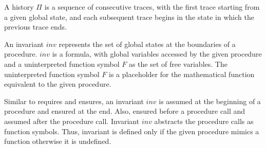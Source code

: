 \documentclass{llncs}
\newcommand{\inv}{\mathit{inv}}
\newcommand{\history}{\Pi}
\newcommand{\F}{\mathit{F}}
\begin{document}
\begin{definition}[history]
  A history $\history$ is a sequence of consecutive traces, with the
  first trace starting from a given global state, and each subsequent
  trace begins in the state in which the previous trace ends.
\end{definition}

\begin{definition}[invariant]
  An invariant $\inv$ represents the set of global states at the
  boundaries of a procedure. $\inv$ is a formula, with 
  global variables accessed by the given procedure and a uninterpreted
  function symbol $\F$ as the set of free variables.
  The uninterpreted function symbol $\F$ is a placeholder for the
  mathematical function equivalent to the given procedure.
  

  
  
  
\end{definition}

Similar to requires and ensures, an invariant $\inv$ is assumed at the
beginning of a procedure and ensured at the end. Also, ensured before
a procedure call and assumed after the procedure call. Invariant
$\inv$ abstracts the procedure calls as function symbols. Thus,
invariant is defined only if the given procedure mimics a function
otherwise it is undefined.
\end{document}

